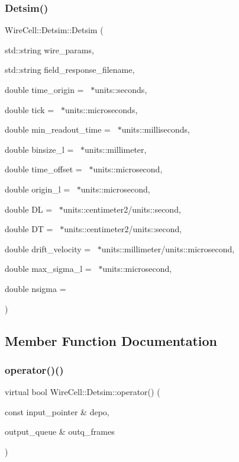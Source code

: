 \subsubsection{\texorpdfstring{Detsim()}{Detsim()}}
{\footnotesize\ttfamily Wire\+Cell\+::\+Detsim\+::\+Detsim (\begin{DoxyParamCaption}\item[{std\+::string}]{wire\+\_\+params,  }\item[{std\+::string}]{field\+\_\+response\+\_\+filename,  }\item[{double}]{time\+\_\+origin = {~$\ast$units\+:\+:seconds},  }\item[{double}]{tick = {~$\ast$units\+:\+:microseconds},  }\item[{double}]{min\+\_\+readout\+\_\+time = {~$\ast$units\+:\+:milliseconds},  }\item[{double}]{binsize\+\_\+l = {~$\ast$units\+:\+:millimeter},  }\item[{double}]{time\+\_\+offset = {~$\ast$units\+:\+:microsecond},  }\item[{double}]{origin\+\_\+l = {~$\ast$units\+:\+:microsecond},  }\item[{double}]{DL = {~$\ast$units\+:\+:centimeter2/units\+:\+:second},  }\item[{double}]{DT = {~$\ast$units\+:\+:centimeter2/units\+:\+:second},  }\item[{double}]{drift\+\_\+velocity = {~$\ast$units\+:\+:millimeter/units\+:\+:microsecond},  }\item[{double}]{max\+\_\+sigma\+\_\+l = {~$\ast$units\+:\+:microsecond},  }\item[{double}]{nsigma = {} }\end{DoxyParamCaption})}



\subsection{Member Function Documentation}
\mbox{\label{class_wire_cell_1_1_detsim_a95dee7e3679dbd59ea5de486d0c31d28}} 
\subsubsection{\texorpdfstring{operator()()}{operator()()}}
{\footnotesize\ttfamily virtual bool Wire\+Cell\+::\+Detsim\+::operator() (\begin{DoxyParamCaption}\item[{const input\+\_\+pointer \&}]{depo,  }\item[{output\+\_\+queue \&}]{outq\+\_\+frames }\end{DoxyParamCaption})\hspace{0.3cm}{\ttfamily [virtual]}}



